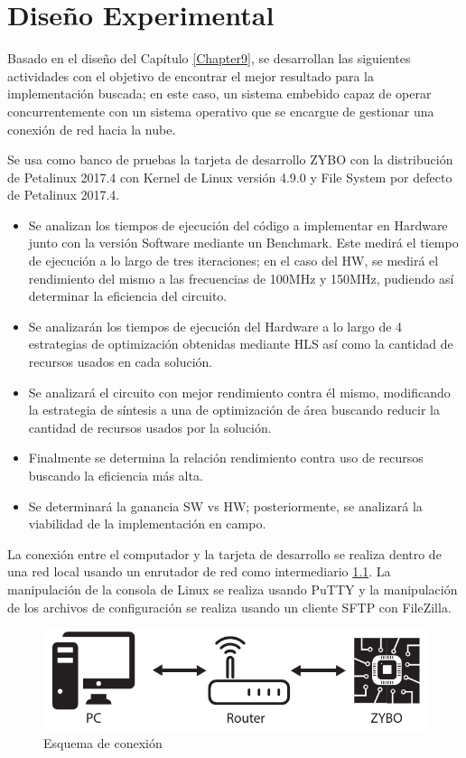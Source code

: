 
\chapter{Diseño Experimental} %
\label{Chapter11}

Basado en el diseño del Capítulo \ref{Chapter9}, se desarrollan las siguientes actividades con el objetivo de encontrar el mejor resultado para la implementación buscada; en este caso, un sistema embebido capaz de operar concurrentemente con un sistema operativo que se encargue de gestionar una conexión de red hacia la nube.

Se usa como banco de pruebas la tarjeta de desarrollo ZYBO con la distribución de Petalinux 2017.4 con Kernel de Linux versión 4.9.0 y File System por defecto de Petalinux 2017.4.
 
 \begin{itemize}
 
  \item Se analizan los tiempos de ejecución del código a implementar en Hardware junto con la versión Software mediante un Benchmark. Este medirá el tiempo de ejecución a lo largo de tres iteraciones; en el caso del HW, se medirá el rendimiento del mismo a las frecuencias de 100MHz y 150MHz, pudiendo así determinar la eficiencia del circuito.
 
 \item Se analizarán los tiempos de ejecución del Hardware a lo largo de 4 estrategias de optimización obtenidas mediante HLS así como la cantidad de recursos usados en cada solución.
 
 \item Se analizará el circuito con mejor rendimiento contra él mismo, modificando la estrategia de síntesis a una de optimización de área buscando reducir la cantidad de recursos usados por la solución.
 
 \item Finalmente se determina la relación rendimiento contra uso de recursos buscando la eficiencia más alta.
 
 \item Se determinará la ganancia SW vs HW; posteriormente, se analizará la viabilidad de la implementación en campo.
 
 \end{itemize}
 
La conexión entre el computador y la tarjeta de desarrollo se realiza dentro de una red local usando un enrutador de red como intermediario \ref{fig:router}. La manipulación de la consola de Linux se realiza usando PuTTY y la manipulación de los archivos de configuración se realiza usando un cliente SFTP con FileZilla. 

\begin{figure}[H]
	\centering
		\includegraphics[scale=1]{./Figures/router.pdf}
	\caption{Esquema de conexión}
	\label{fig:router}
\end{figure}

